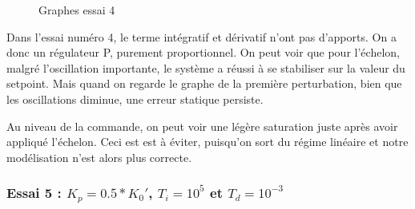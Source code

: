 \begin{figure}[H]
    \centering
    \caption{Graphes essai 4}
    \label{fig:essai-4}
\end{figure}

Dans l'essai numéro 4, le terme intégratif et dérivatif n'ont pas d'apports.
On a donc un régulateur P, purement proportionnel. On peut voir que pour 
l'échelon, malgré l'oscillation importante, le système a réussi à se stabiliser
sur la valeur du setpoint. Mais quand on regarde le graphe de la première perturbation,
bien que les oscillations diminue, une erreur statique persiste.

Au niveau de la commande, on peut voir une légère saturation juste après avoir appliqué l'échelon.
Ceci est est à éviter, puisqu'on sort du régime linéaire et notre modélisation n'est alors plus correcte.


\subsubsection{Essai 5 : $K_{p} = 0.5*K_{0}'$, $T_{i} = 10^{5}$ et $T_{d} = 10^{-3}$}

